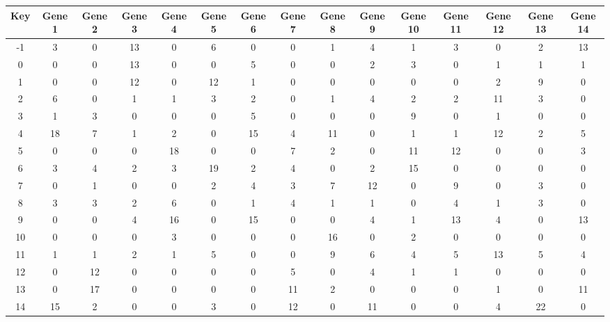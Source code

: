 \begin{tabular}{|c|c|c|c|c|c|c|c|c|c|c|c|c|c|c|}
\hline
Key & Gene 1 & Gene 2 & Gene 3 & Gene 4 & Gene 5 & Gene 6 & Gene 7 & Gene 8 & Gene 9 & Gene 10 & Gene 11 & Gene 12 & Gene 13 & Gene 14 \\
\hline
-1 & 3 & 0 & 13 & 0 & 6 & 0 & 0 & 1 & 4 & 1 & 3 & 0 & 2 & 13 \\
0 & 0 & 0 & 13 & 0 & 0 & 5 & 0 & 0 & 2 & 3 & 0 & 1 & 1 & 1 \\
1 & 0 & 0 & 12 & 0 & 12 & 1 & 0 & 0 & 0 & 0 & 0 & 2 & 9 & 0 \\
2 & 6 & 0 & 1 & 1 & 3 & 2 & 0 & 1 & 4 & 2 & 2 & 11 & 3 & 0 \\
3 & 1 & 3 & 0 & 0 & 0 & 5 & 0 & 0 & 0 & 9 & 0 & 1 & 0 & 0 \\
4 & 18 & 7 & 1 & 2 & 0 & 15 & 4 & 11 & 0 & 1 & 1 & 12 & 2 & 5 \\
5 & 0 & 0 & 0 & 18 & 0 & 0 & 7 & 2 & 0 & 11 & 12 & 0 & 0 & 3 \\
6 & 3 & 4 & 2 & 3 & 19 & 2 & 4 & 0 & 2 & 15 & 0 & 0 & 0 & 0 \\
7 & 0 & 1 & 0 & 0 & 2 & 4 & 3 & 7 & 12 & 0 & 9 & 0 & 3 & 0 \\
8 & 3 & 3 & 2 & 6 & 0 & 1 & 4 & 1 & 1 & 0 & 4 & 1 & 3 & 0 \\
9 & 0 & 0 & 4 & 16 & 0 & 15 & 0 & 0 & 4 & 1 & 13 & 4 & 0 & 13 \\
10 & 0 & 0 & 0 & 3 & 0 & 0 & 0 & 16 & 0 & 2 & 0 & 0 & 0 & 0 \\
11 & 1 & 1 & 2 & 1 & 5 & 0 & 0 & 9 & 6 & 4 & 5 & 13 & 5 & 4 \\
12 & 0 & 12 & 0 & 0 & 0 & 0 & 5 & 0 & 4 & 1 & 1 & 0 & 0 & 0 \\
13 & 0 & 17 & 0 & 0 & 0 & 0 & 11 & 2 & 0 & 0 & 0 & 1 & 0 & 11 \\
14 & 15 & 2 & 0 & 0 & 3 & 0 & 12 & 0 & 11 & 0 & 0 & 4 & 22 & 0 \\
\hline
\end{tabular}